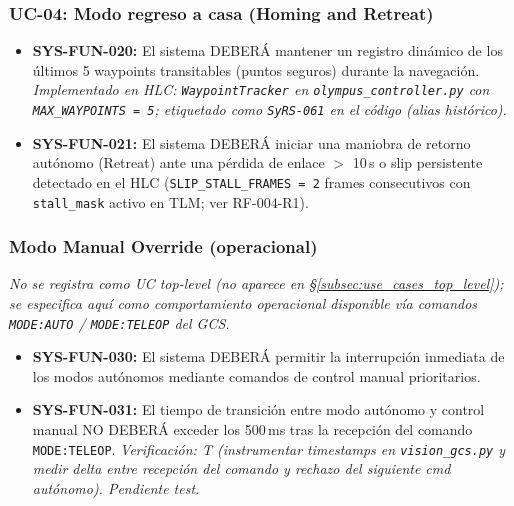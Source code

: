 \subsubsection{UC-04: Modo regreso a casa (Homing and Retreat)}
\begin{itemize}
    \item \textbf{SYS-FUN-020:} El sistema DEBERÁ mantener un registro dinámico de los últimos 5 waypoints transitables (puntos seguros) durante la navegación. \emph{Implementado en HLC: \texttt{WaypointTracker} en \texttt{olympus\_controller.py} con \texttt{MAX\_WAYPOINTS = 5}; etiquetado como \texttt{SyRS-061} en el código (alias histórico).}
    \item \textbf{SYS-FUN-021:} El sistema DEBERÁ iniciar una maniobra de retorno autónomo (Retreat) ante una pérdida de enlace $>$ 10\,s o slip persistente detectado en el HLC (\texttt{SLIP\_STALL\_FRAMES = 2} frames consecutivos con \texttt{stall\_mask} activo en TLM; ver RF-004-R1).
\end{itemize}

\subsubsection{Modo Manual Override (operacional)}
\emph{No se registra como UC top-level (no aparece en \S\ref{subsec:use_cases_top_level}); se especifica aquí como comportamiento operacional disponible vía comandos \texttt{MODE:AUTO} / \texttt{MODE:TELEOP} del GCS.}
\begin{itemize}
    \item \textbf{SYS-FUN-030:} El sistema DEBERÁ permitir la interrupción inmediata de los modos autónomos mediante comandos de control manual prioritarios.
    \item \textbf{SYS-FUN-031:} El tiempo de transición entre modo autónomo y control manual NO DEBERÁ exceder los 500\,ms tras la recepción del comando \texttt{MODE:TELEOP}. \emph{Verificación: T (instrumentar timestamps en \texttt{vision\_gcs.py} y medir delta entre recepción del comando y rechazo del siguiente cmd autónomo). Pendiente test.}
\end{itemize}

